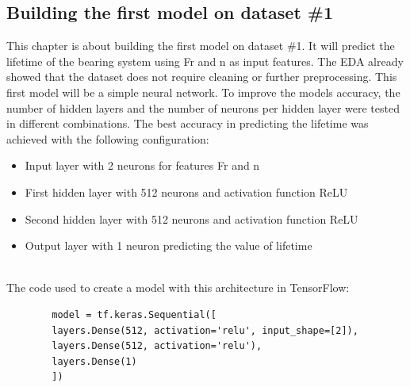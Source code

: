 \documentclass[letterpaper,10pt]{article}
\begin{document}
	
	
	
	
	
	
	
	
	
	
	
	
	
	
	\subsection{Building the first model on dataset \#1}
	This chapter is about building the first model on dataset \#1. It will predict the lifetime of the bearing system using Fr and n as input features. The EDA already showed that the dataset does not require cleaning or further preprocessing.
	\newline This first model will be a simple neural network. To improve the models accuracy, the number of hidden layers and the number of neurons per hidden layer were tested in different combinations. The best accuracy in predicting the lifetime was achieved with the following configuration: 
	\begin{itemize}
		\item Input layer with 2 neurons for features Fr and n
		\item First hidden layer with 512 neurons and activation function ReLU
		\item Second hidden layer with 512 neurons and activation function ReLU
		\item Output layer with 1 neuron predicting the value of lifetime
	\end{itemize} 
	\ \\The code used to create a model with this architecture in TensorFlow:
	\begin{lstlisting}
		model = tf.keras.Sequential([
		layers.Dense(512, activation='relu', input_shape=[2]), 
		layers.Dense(512, activation='relu'),  
		layers.Dense(1)
		])
	\end{lstlisting}

	
	
	
	
	
	
	
	
	
	
	
	
	
	
	
	
	
	
	
	
	
	
	
	
\end{document}
